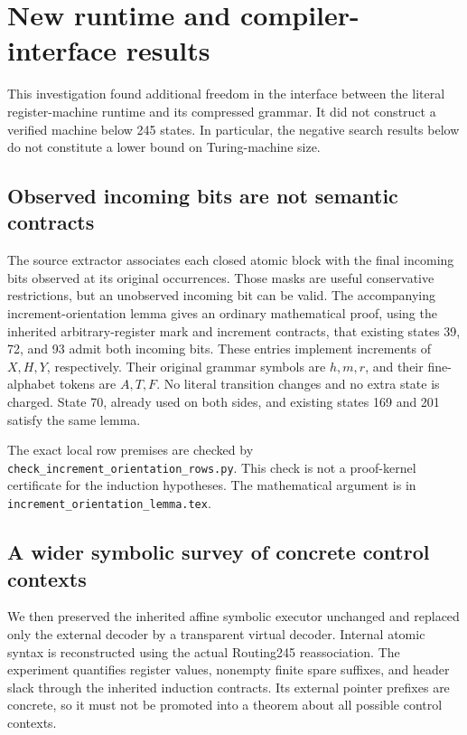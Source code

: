 \section{New runtime and compiler-interface results}
\label{sec:runtime-new}

This investigation found additional freedom in the interface between the
literal register-machine runtime and its compressed grammar. It did not
construct a verified machine below 245 states. In particular, the negative
search results below do not constitute a lower bound on Turing-machine size.

\subsection{Observed incoming bits are not semantic contracts}

The source extractor associates each closed atomic block with the final
incoming bits observed at its original occurrences. Those masks are useful
conservative restrictions, but an unobserved incoming bit can be valid.
The accompanying increment-orientation lemma gives an ordinary mathematical
proof, using the inherited arbitrary-register mark and increment contracts,
that existing states 39, 72, and 93 admit both incoming bits. These entries
implement increments of $X,H,Y$, respectively. Their original grammar symbols
are $h,m,r$, and their fine-alphabet tokens are $A,T,F$. No literal transition
changes and no extra state is charged. State 70, already used on both sides,
and existing states 169 and 201 satisfy the same lemma.

The exact local row premises are checked by
\texttt{check\_increment\_orientation\_rows.py}. This check is not a proof-kernel
certificate for the induction hypotheses. The mathematical argument is in
\texttt{increment\_orientation\_lemma.tex}.

\subsection{A wider symbolic survey of concrete control contexts}

We then preserved the inherited affine symbolic executor unchanged and
replaced only the external decoder by a transparent virtual decoder. Internal
atomic syntax is reconstructed using the actual Routing245 reassociation.
The experiment quantifies register values, nonempty finite spare suffixes,
and header slack through the inherited induction contracts. Its external
pointer prefixes are concrete, so it must not be promoted into a theorem
about all possible control contexts.


